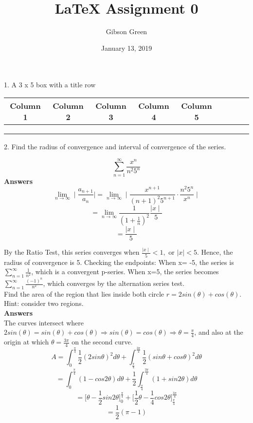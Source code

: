 \documentclass{article}
\title{LaTeX Assignment 0}
\author{Gibson Green }
\date{January 13, 2019}
\begin{document}
\maketitle

1. A 3 x 5 box with a title row

\vspace{5mm}
\begin{tabular}{|c|c|c|c|c|} 
 \hline
 Column 1 & Column 2 & Column 3 & Column 4 & Column 5 \\
 \hline
& & & & & & & & &\\ \hline
& & & & & & & & &\\ \hline
& & & & & & & & &\\ \hline
 \end{tabular}
 \vspace{5mm}
 
 2. Find the radius of convergence and interval of convergence of the series.
 
 $$\sum_{n=1}^{\infty} \frac{x^{n}}{n^{2}5^{n}}$$
 \textbf{Answers}
 \vspace{5mm}
 $$\lim_{n\to\infty} \mid \frac{a_{n+1}}{a_n} \mid = \lim_{n\to\infty} \mid \frac{x^{n+1}}{(n+1)^2 5^{n+1}} \cdot \frac{n^2 5^n}{x^n} \mid $$
 $$= \lim_{n\to\infty} \frac{1}{(1+\frac{1}{n})^2} \frac{\mid x \mid}{5}$$
 $$= \frac{\mid x \mid}{5} $$
 
\vspace{5mm}
By the Ratio Test, this series converges when $\frac{\mid x \mid}{5}<1,$ or $\mid x \mid <5$. Hence, the radius of convergence is 5. Checking the endpoints: When x= -5, the series is $\sum_{n=1}^{\infty} \frac{1}{n^2}$, which is a convergent p-series. When x=5, the series becomes $\sum_{n=1}^{\infty} \frac{(-1)^n}{n^2}$, which converges by the alternation series test. \\

\vspace{5mm}
Find the area of the region that lies inside both circle $r= 2sin(\theta) + cos(\theta).$ Hint: consider two regions. \\
 \textbf{Answers} \\
 The curves intersect where $2 sin(\theta)= sin(\theta)+cos(\theta) \Rightarrow{}sin(\theta)= cos(\theta) \Rightarrow{}\theta = \frac{\pi}{4}$, and also at the origin at which $\theta= \frac{3\pi}{4}$ on the second curve. \\

\vspace{5mm}
$$A= \int_{0}^{\frac{\pi}{4}} \frac{1}{2} (2sin\theta)^2 d\theta + \int_{\frac{\pi}{4}}^{\frac{3\pi}{4}} \frac{1}{2} (sin\theta + cos\theta)^2 d\theta $$
$$ = \int_{0}^{\frac{\pi}{4}} (1-cos2\theta) d\theta + \frac{1}{2} \int_{\frac{\pi}{4}}^{\frac{3\pi}{4}} (1 + sin2\theta) d\theta $$
$$= \Big[\theta - \frac{1}{2}sin2\theta \Big]^{\frac{\pi}{4}}_0 + 
\Big[\frac{1}{2}\theta - \frac{1}{4}cos2\theta \Big]^{\frac{3\pi}{4}}_\frac{\pi}{4}$$
$$= \frac{1}{2} (\pi - 1) $$
\end{document}
